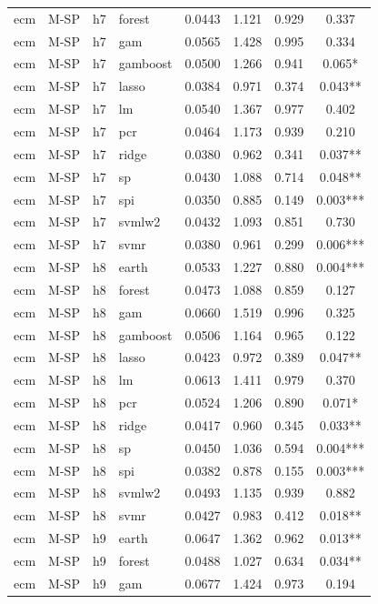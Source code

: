 \begin{ThreePartTable}
\begin{longtable}[t]{llclcccc}
ecm & M-SP & h7 & forest & 0.0443 & 1.121 & 0.929 & 0.337\\
ecm & M-SP & h7 & gam & 0.0565 & 1.428 & 0.995 & 0.334\\
ecm & M-SP & h7 & gamboost & 0.0500 & 1.266 & 0.941 & 0.065*\\
ecm & M-SP & h7 & lasso & 0.0384 & 0.971 & 0.374 & 0.043**\\
ecm & M-SP & h7 & lm & 0.0540 & 1.367 & 0.977 & 0.402\\
ecm & M-SP & h7 & pcr & 0.0464 & 1.173 & 0.939 & 0.210\\
ecm & M-SP & h7 & ridge & 0.0380 & 0.962 & 0.341 & 0.037**\\
ecm & M-SP & h7 & sp & 0.0430 & 1.088 & 0.714 & 0.048**\\
ecm & M-SP & h7 & spi & 0.0350 & 0.885 & 0.149 & 0.003***\\
ecm & M-SP & h7 & svmlw2 & 0.0432 & 1.093 & 0.851 & 0.730\\
ecm & M-SP & h7 & svmr & 0.0380 & 0.961 & 0.299 & 0.006***\\
\addlinespace
ecm & M-SP & h8 & earth & 0.0533 & 1.227 & 0.880 & 0.004***\\
ecm & M-SP & h8 & forest & 0.0473 & 1.088 & 0.859 & 0.127\\
ecm & M-SP & h8 & gam & 0.0660 & 1.519 & 0.996 & 0.325\\
ecm & M-SP & h8 & gamboost & 0.0506 & 1.164 & 0.965 & 0.122\\
ecm & M-SP & h8 & lasso & 0.0423 & 0.972 & 0.389 & 0.047**\\
ecm & M-SP & h8 & lm & 0.0613 & 1.411 & 0.979 & 0.370\\
ecm & M-SP & h8 & pcr & 0.0524 & 1.206 & 0.890 & 0.071*\\
ecm & M-SP & h8 & ridge & 0.0417 & 0.960 & 0.345 & 0.033**\\
ecm & M-SP & h8 & sp & 0.0450 & 1.036 & 0.594 & 0.004***\\
ecm & M-SP & h8 & spi & 0.0382 & 0.878 & 0.155 & 0.003***\\
ecm & M-SP & h8 & svmlw2 & 0.0493 & 1.135 & 0.939 & 0.882\\
ecm & M-SP & h8 & svmr & 0.0427 & 0.983 & 0.412 & 0.018**\\
\addlinespace
ecm & M-SP & h9 & earth & 0.0647 & 1.362 & 0.962 & 0.013**\\
ecm & M-SP & h9 & forest & 0.0488 & 1.027 & 0.634 & 0.034**\\
ecm & M-SP & h9 & gam & 0.0677 & 1.424 & 0.973 & 0.194\\

\end{longtable}
\end{ThreePartTable}
